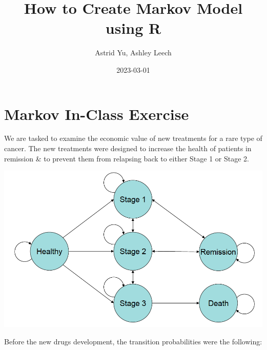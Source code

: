 \documentclass[
  letterpaper,
  DIV=11,
  numbers=noendperiod,
  oneside]{scrartcl}
\title{How to Create Markov Model using R}
\author{Astrid Yu, Ashley Leech}
\date{2023-03-01}
\renewcommand*\contentsname{Table of contents}
\newcommand\contentsname{Table of contents}
\begin{document}
\maketitle
\ifdefined\Shaded\renewenvironment{Shaded}{\begin{tcolorbox}[frame hidden, colback={shadecolor}, boxrule=0pt, breakable, enhanced]}{\end{tcolorbox}}\fi

\renewcommand*\contentsname{Table of contents}
{
\hypersetup{linkcolor=}
\setcounter{tocdepth}{3}
\tableofcontents
}
\hypertarget{markov-in-class-exercise}{%
\section{Markov In-Class Exercise}\label{markov-in-class-exercise}}

We are tasked to examine the economic value of new treatments for a rare
type of cancer. The new treatments were designed to increase the health
of patients in remission \& to prevent them from relapsing back to
either Stage 1 or Stage 2.

\includegraphics{exercise/markov_diagram.png}

Before the new drugs development, the transition probabilities were the
following:
\end{document}
